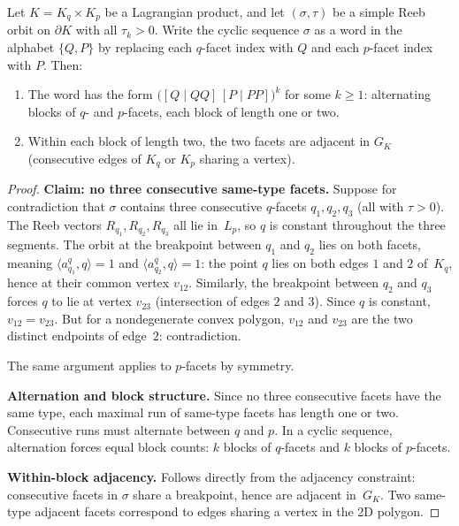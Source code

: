 \begin{unverified}
\begin{lemma}\label{lem:sigma-structure}
Let $K = K_q \times K_p$ be a Lagrangian product, and let
$(\sigma, \tau)$ be a simple Reeb orbit on $\partial K$
with all $\tau_k > 0$.
Write the cyclic sequence $\sigma$ as a word in the alphabet
$\{Q, P\}$ by replacing each $q$-facet index with $Q$ and each
$p$-facet index with $P$.
Then:
\begin{enumerate}
\item[(i)] The word has the form
  $\bigl([Q \mid QQ]\,[P \mid PP]\bigr)^k$ for some $k \geq 1$:
  alternating blocks of $q$- and $p$-facets, each block of length
  one or two.

\item[(ii)] Within each block of length two, the two facets are
  adjacent in $G_K$
  (consecutive edges of $K_q$ or $K_p$ sharing a vertex).
\end{enumerate}
\end{lemma}

\begin{proof}
\textbf{Claim: no three consecutive same-type facets.}\quad
Suppose for contradiction that $\sigma$ contains three
consecutive $q$-facets $q_1, q_2, q_3$ (all with $\tau > 0$).
The Reeb vectors $R_{q_1}, R_{q_2}, R_{q_3}$ all lie in~$L_p$,
so $q$ is constant throughout the three segments.
The orbit at the breakpoint between $q_1$ and $q_2$ lies on
both facets, meaning $\langle a_{q_1}^q, q \rangle = 1$
and $\langle a_{q_2}^q, q \rangle = 1$: the point $q$
lies on both edges $1$ and $2$ of~$K_q$, hence at their
common vertex $v_{12}$.
Similarly, the breakpoint between $q_2$ and $q_3$ forces $q$
to lie at vertex $v_{23}$ (intersection of edges $2$ and $3$).
Since $q$ is constant, $v_{12} = v_{23}$.
But for a nondegenerate convex polygon, $v_{12}$ and $v_{23}$
are the two distinct endpoints of edge~$2$: contradiction.

The same argument applies to $p$-facets by symmetry.

\medskip\noindent
\textbf{Alternation and block structure.}\quad
Since no three consecutive facets have the same type, each maximal
run of same-type facets has length one or two.
Consecutive runs must alternate between $q$ and $p$.
In a cyclic sequence, alternation forces equal block counts:
$k$ blocks of $q$-facets and $k$ blocks of $p$-facets.

\medskip\noindent
\textbf{Within-block adjacency.}\quad
Follows directly from the adjacency constraint:
consecutive facets in $\sigma$ share a breakpoint, hence are
adjacent in~$G_K$.
Two same-type adjacent facets correspond to edges sharing a
vertex in the 2D polygon.
\end{proof}
\end{unverified}


